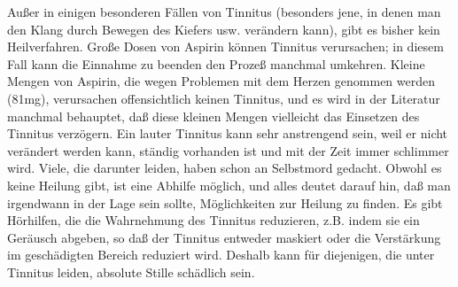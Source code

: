 Außer in einigen besonderen Fällen von Tinnitus (besonders jene, in denen man den Klang durch Bewegen des Kiefers usw. verändern kann), gibt es bisher kein Heilverfahren.
Große Dosen von Aspirin können Tinnitus verursachen; in diesem Fall kann die Einnahme zu beenden den Prozeß manchmal umkehren.
Kleine Mengen von Aspirin, die wegen Problemen mit dem Herzen genommen werden (81mg), verursachen offensichtlich keinen Tinnitus, und es wird in der Literatur manchmal behauptet, daß diese kleinen Mengen vielleicht das Einsetzen des Tinnitus verzögern.
Ein lauter Tinnitus kann sehr anstrengend sein, weil er nicht verändert werden kann, ständig vorhanden ist und mit der Zeit immer schlimmer wird.
Viele, die darunter leiden, haben schon an Selbstmord gedacht.
Obwohl es keine Heilung gibt, ist eine Abhilfe möglich, und alles deutet darauf hin, daß man irgendwann in der Lage sein sollte, Möglichkeiten zur Heilung zu finden.
Es gibt Hörhilfen, die die Wahrnehmung des Tinnitus reduzieren, z.B. indem sie ein Geräusch abgeben, so daß der Tinnitus entweder maskiert oder die Verstärkung im geschädigten Bereich reduziert wird.
Deshalb kann für diejenigen, die unter Tinnitus leiden, absolute Stille schädlich sein.

